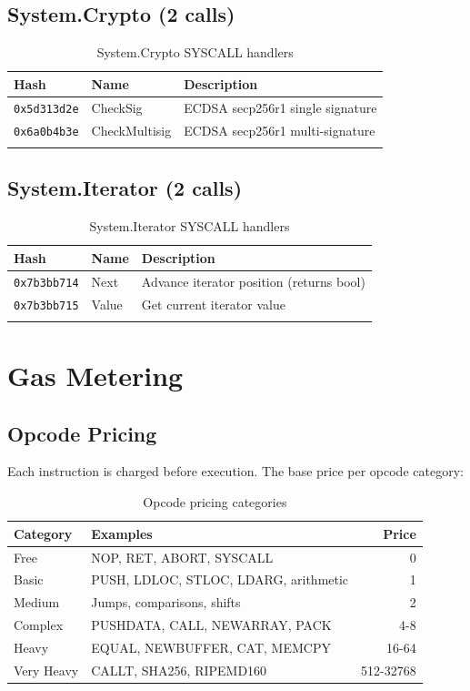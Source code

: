 \documentclass[11pt,a4paper]{article}
\begin{document}
\subsection{System.Crypto (2 calls)}

\begin{longtable}{@{}lp{4cm}p{5cm}@{}}
\toprule
\textbf{Hash} & \textbf{Name} & \textbf{Description} \\
\midrule
\endhead
\texttt{0x5d313d2e} & CheckSig & ECDSA secp256r1 single signature \\
\texttt{0x6a0b4b3e} & CheckMultisig & ECDSA secp256r1 multi-signature \\
\bottomrule
\caption{System.Crypto SYSCALL handlers}
\end{longtable}

\subsection{System.Iterator (2 calls)}

\begin{longtable}{@{}lp{4cm}p{5cm}@{}}
\toprule
\textbf{Hash} & \textbf{Name} & \textbf{Description} \\
\midrule
\endhead
\texttt{0x7b3bb714} & Next & Advance iterator position (returns bool) \\
\texttt{0x7b3bb715} & Value & Get current iterator value \\
\bottomrule
\caption{System.Iterator SYSCALL handlers}
\end{longtable}

\section{Gas Metering}
\label{sec:gas}

\subsection{Opcode Pricing}

Each instruction is charged before execution. The base price per opcode
category:

\begin{table}[H]
\centering
\begin{tabular}{lp{6cm}r}
\toprule
\textbf{Category} & \textbf{Examples} & \textbf{Price} \\
\midrule
Free        & NOP, RET, ABORT, SYSCALL & 0 \\
Basic       & PUSH, LDLOC, STLOC, LDARG, arithmetic & 1 \\
Medium      & Jumps, comparisons, shifts & 2 \\
Complex     & PUSHDATA, CALL, NEWARRAY, PACK & 4-8 \\
Heavy       & EQUAL, NEWBUFFER, CAT, MEMCPY & 16-64 \\
Very Heavy  & CALLT, SHA256, RIPEMD160 & 512-32768 \\
\bottomrule
\end{tabular}
\caption{Opcode pricing categories}
\label{tab:opcode-prices}
\end{table}
\end{document}
